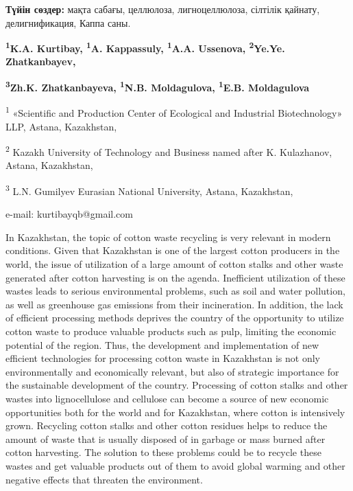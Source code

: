 {\bfseries Түйін сөздер:} мақта сабағы, целлюлоза, лигноцеллюлоза, сілтілік
қайнату, делигнификация, Каппа саны.


\begin{center}
{\bfseries \textsuperscript{1}K.A. Kurtibay, \textsuperscript{1}A.
Kappassuly, \textsuperscript{1}A.A. Ussenova, \textsuperscript{2}Ye.Ye.
Zhatkanbayev,}

{\bfseries \textsuperscript{3}Zh.K. Zhatkanbayeva, \textsuperscript{1}N.B.
Moldagulova, \textsuperscript{1}E.B. Moldagulova}

\textsuperscript{1} «Scientific and Production Center of Ecological and
Industrial Biotechnology» LLP, Astana, Kazakhstan,

\textsuperscript{2} Kazakh University of Technology and Business named
after K. Kulazhanov, Astana, Kazakhstan,

\textsuperscript{3} L.N. Gumilyev Eurasian National University, Astana,
Kazakhstan,

e-mail: kurtibayqb@gmail.com
\end{center}

In Kazakhstan, the topic of cotton waste recycling is very relevant in
modern conditions. Given that Kazakhstan is one of the largest cotton
producers in the world, the issue of utilization of a large amount of
cotton stalks and other waste generated after cotton harvesting is on
the agenda. Inefficient utilization of these wastes leads to serious
environmental problems, such as soil and water pollution, as well as
greenhouse gas emissions from their incineration. In addition, the lack
of efficient processing methods deprives the country of the opportunity
to utilize cotton waste to produce valuable products such as pulp,
limiting the economic potential of the region. Thus, the development and
implementation of new efficient technologies for processing cotton waste
in Kazakhstan is not only environmentally and economically relevant, but
also of strategic importance for the sustainable development of the
country. Processing of cotton stalks and other wastes into
lignocellulose and cellulose can become a source of new economic
opportunities both for the world and for Kazakhstan, where cotton is
intensively grown. Recycling cotton stalks and other cotton residues
helps to reduce the amount of waste that is usually disposed of in
garbage or mass burned after cotton harvesting. The solution to these
problems could be to recycle these wastes and get valuable products out
of them to avoid global warming and other negative effects that threaten
the environment.

